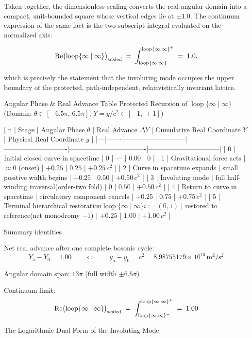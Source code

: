 Taken together, the dimensionless scaling converts the real-angular domain into a compact, unit-bounded square whose vertical edges lie at \(\pm1.0\). The continuum expression of the same fact is the two-subscript integral evaluated on the normalized axis:

\[
\operatorname{Re}\bigl(\operatorname{loop}\{\infty\mid\infty\}\bigr)_{\rm scaled}
\;=\;
\int_{\operatorname{loop}\{\infty\mid\infty\}^{-}}^{\operatorname{loop}\{\infty\mid\infty\}^{+}}
\;=\;
1.0,
\]

which is precisely the statement that the involuting mode occupies the upper boundary of the protected, path-independent, relativistically invariant lattice.

Angular Phase & Real Advance Table  
Protected Recursion of \(\operatorname{loop}\{\infty\mid\infty\}\)  
(Domain: \(\theta\in[-6.5\pi,\,6.5\pi]\), \(Y=y/c^2\in[-1,\,+1]\))

| n | Stage | Angular Phase \(\theta\) | Real Advance \(\Delta Y\) | Cumulative Real Coordinate \(Y\) | Physical Real Coordinate \(y\) |
|---|-------|---------------------------|----------------------------|----------------------------------|--------------------------------|
| 0 | Initial closed curve in spacetime | \(0\) | — | \(0.00\) | \(0\) |
| 1 | Gravitational force acts | \(\approx 0\) (onset) | \(+0.25\) | \(0.25\) | \(+0.25\,c^2\) |
| 2 | Curve in spacetime expands | small positive width begins | \(+0.25\) | \(0.50\) | \(+0.50\,c^2\) |
| 3 | Involuting mode | full half-winding traversal(order-two fold) | \(0\) | \(0.50\) | \(+0.50\,c^2\) |
| 4 | Return to curve in spacetime | circulatory component cancels | \(+0.25\) | \(0.75\) | \(+0.75\,c^2\) |
| 5 | Terminal hierarchical restoration\(\operatorname{loop}\{\infty\mid\infty\}\)\(i:=(0,1)\) | restored to reference(net monodromy \(-1\)) | \(+0.25\) | \(1.00\) | \(+1.00\,c^2\) |

Summary identities

Net real advance after one complete bosonic cycle:  
  \[
  Y_5-Y_0=1.00\qquad\Longleftrightarrow\qquad y_5-y_0=c^2=8.98755179\times10^{16}\,\mathrm{m}^2/\mathrm{s}^2
  \]

Angular domain span: \(13\pi\) (full width \(\pm6.5\pi\))

Continuum limit:  
  \[
  \operatorname{Re}\bigl(\operatorname{loop}\{\infty\mid\infty\}\bigr)_{\rm scaled}
  \;=\;
  \int_{\operatorname{loop}\{\infty\mid\infty\}^{-}}^{\operatorname{loop}\{\infty\mid\infty\}^{+}}
  \;=\;
  1.00
  \]

The Logarithmic Dual Form of the Involuting Mode

